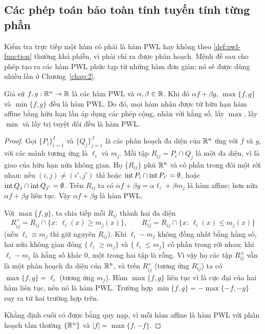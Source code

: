 \subsection{Các phép toán bảo toàn tính tuyến tính từng phần}

Kiểm tra trực tiếp một hàm có phải là hàm PWL hay không theo \cref{def:pwl-function} thường khá phiền, vì phải chỉ ra được phân hoạch. Mệnh đề sau cho phép tạo ra các hàm PWL phức tạp từ những hàm đơn giản; nó sẽ được dùng nhiều lần ở Chương~\ref{chap:2}.

\begin{proposition}\label{prop:closure}
Giả sử $f,g:\mathbb{R}^n\to\mathbb{R}$ là các hàm PWL và $\alpha,\beta\in\mathbb{R}$. Khi đó $\alpha f+\beta g$, $\max\{f,g\}$ và $\min\{f,g\}$ đều là hàm PWL. Do đó, mọi hàm nhận được từ hữu hạn hàm affine bằng hữu hạn lần áp dụng các phép cộng, nhân với hằng số, lấy $\max$, lấy $\min$ và lấy trị tuyệt đối đều là hàm PWL.
\end{proposition}

\begin{proof}
Gọi $\{P_i\}_{i=1}^{I}$ và $\{Q_j\}_{j=1}^{J}$ là các phân hoạch đa diện của $\mathbb{R}^n$ ứng với $f$ và $g$, với các mảnh tương ứng là $\ell_i$ và $m_j$. Mỗi tập $R_{ij}=P_i\cap Q_j$ là một đa diện, vì là giao của hữu hạn nửa không gian. Họ $\{R_{ij}\}$ phủ $\mathbb{R}^n$ và có phần trong đôi một rời nhau: nếu $(i,j)\neq(i',j')$ thì hoặc $\operatorname{int} P_i\cap\operatorname{int} P_{i'}=\emptyset$, hoặc $\operatorname{int} Q_j\cap\operatorname{int} Q_{j'}=\emptyset$. Trên $R_{ij}$ ta có $\alpha f+\beta g=\alpha\ell_i+\beta m_j$ là hàm affine; hơn nữa $\alpha f+\beta g$ liên tục. Vậy $\alpha f+\beta g$ là hàm PWL.

Với $\max\{f,g\}$, ta chia tiếp mỗi $R_{ij}$ thành hai đa diện
\[
R_{ij}^{+}=R_{ij}\cap\{x:\ \ell_i(x)\ge m_j(x)\},\qquad R_{ij}^{-}=R_{ij}\cap\{x:\ \ell_i(x)\le m_j(x)\}
\]
(nếu $\ell_i\equiv m_j$ thì giữ nguyên $R_{ij}$). Khi $\ell_i-m_j$ không đồng nhất bằng hằng số, hai nửa không gian đóng $\{\ell_i\ge m_j\}$ và $\{\ell_i\le m_j\}$ có phần trong rời nhau; khi $\ell_i-m_j$ là hằng số khác $0$, một trong hai tập là rỗng. Vì vậy họ các tập $R_{ij}^{\pm}$ vẫn là một phân hoạch đa diện của $\mathbb{R}^n$, và trên $R_{ij}^{+}$ (tương ứng $R_{ij}^{-}$) ta có $\max\{f,g\}=\ell_i$ (tương ứng $m_j$). Hàm $\max\{f,g\}$ liên tục vì là cực đại của hai hàm liên tục, nên nó là hàm PWL. Trường hợp $\min\{f,g\}=-\max\{-f,-g\}$ suy ra từ hai trường hợp trên.

Khẳng định cuối có được bằng quy nạp, vì mỗi hàm affine là hàm PWL với phân hoạch tầm thường $\{\mathbb{R}^n\}$ và $|f|=\max\{f,-f\}$.
\end{proof}

